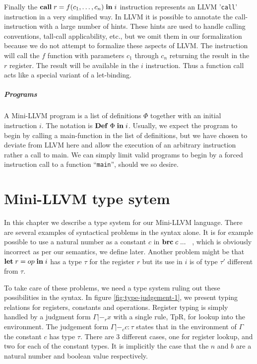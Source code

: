 \documentclass[a4paper, oneside, 10pt, draft]{memoir}
\begin{document}
Finally the $\mathbf{call} \; r = f (c_1, \dotsc, c_n)\; \mathbf{in} \; i$ instruction
represents an LLVM '\texttt{call}' instruction in a very simplified
way. In LLVM it is possible to annotate the call-instruction with a
large number of hints. These hints are used to handle calling
conventions, tall-call applicability, etc., but we omit them in our
formalization because we do not attempt to formalize these aspects of
LLVM. The instruction will call the $f$ function with parameters $c_1$
through $c_n$ returning the result in the $r$ register. The result
will be available in the $i$ instruction. Thus a function call acts
like a special variant of a let-binding.

\paragraph{Programs}

A Mini-LLVM program is a list of definitions $\Phi$ together with an
initial instruction $i$. The notation is $\mathbf{Def} \; \Phi \; \mathbf{in} \; i$. Usually, we
expect the program to begin by calling a main-function in the list of
definitions, but we have chosen to deviate from LLVM here and allow
the execution of an arbitrary instruction rather a call to main. We
can simply limit valid programs to begin by a forced instruction
call to a function ``\texttt{main}'', should we so desire.

\chapter{Mini-LLVM type sytem}
\label{chap:type-system}

In this chapter we describe a type system for our Mini-LLVM
language. There are several examples of syntactical problems in the
syntax alone. It is for example possible to use a natural number as a
constant $c$ in $\mathbf{brc} \; c \; ... \;  \;  \;$, which is obviously incorrect as
per our semantics, we define later. Another problem might be that
$\mathbf{let} \; r = op \; \mathbf{in} \; i$ has a type $\tau$ for the register $r$ but its use
in $i$ is of type $\tau'$ different from $\tau$.

\newcommand{\tpr}{|-_{r}}
\newcommand{\tpc}{|-_{c}}
\newcommand{\tpop}{|-_{o}}
\newcommand{\tpb}{|-_{b}}

To take care of these problems, we need a type system ruling out these
possibilities in the syntax. In figure \ref{fig:type-judgement-1}, we
present typing relations for registers, constants and
operations. Register typing is simply handled by a judgment form
$\boxed{\Gamma \tpr x}$ with a single rule, TpR, for lookup into the
environment. The judgement form $\boxed{\Gamma \tpc c : \tau}$ states
that in the environment of $\Gamma$ the constant $c$ has type
$\tau$. There are 3 different cases, one for register lookup, and two
for each of the constant types. It is implicitly the case that the $n$
and $b$ are a natural number and boolean value respectively.
\end{document}
